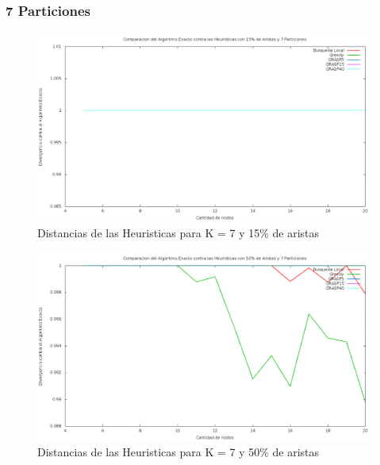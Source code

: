 \subsubsection{7 Particiones}

\begin{figure}[H]
\begin{center}
\includegraphics[scale=0.3]{finales/ComparacionesCon7Particiones15Aristas.png}
\caption{Distancias de las Heuristicas para K = 7 y 15\% de aristas}
\end{center}
\end{figure}

\begin{figure}[H]
\begin{center}
\includegraphics[scale=0.3]{finales/ComparacionesCon7Particiones50Aristas.png}
\caption{Distancias de las Heuristicas para K = 7 y 50\% de aristas}
\end{center}
\end{figure}

